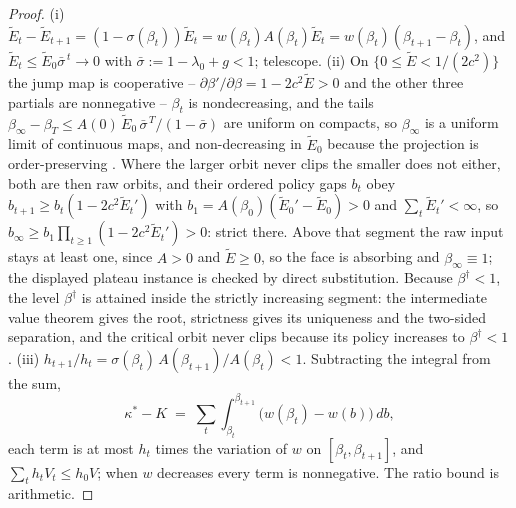 \documentclass[11pt]{article}
\theoremstyle{definition}
\theoremstyle{remark}
\numberwithin{equation}{section}
\begin{document}
\begin{proof}
(i) $\tilde E_t - \tilde E_{t+1} = (1-\sigma(\beta_t))\tilde E_t = w(\beta_t)A(\beta_t)\tilde E_t = w(\beta_t)(\beta_{t+1}-\beta_t)$, and $\tilde E_t \le \tilde E_0\bar\sigma^{\,t} \to 0$ with $\bar\sigma := 1-\lambda_0+g < 1$; telescope. (ii) On $\{0 \le \tilde E < 1/(2c^2)\}$ the jump map is cooperative -- $\partial\beta'/\partial\beta = 1-2c^2\tilde E > 0$ and the other three partials are nonnegative -- $\beta_t$ is nondecreasing, and the tails $\beta_\infty - \beta_T \le A(0)\,\tilde E_0\,\bar\sigma^{\,T}/(1-\bar\sigma)$ are uniform on compacts, so $\beta_\infty$ is a uniform limit of continuous maps, and non-decreasing in $\tilde E_0$ because the projection is order-preserving \citep{hofheinz2026drift}. Where the larger orbit never clips the smaller does not either, both are then raw orbits, and their ordered policy gaps $b_t$ obey $b_{t+1} \ge b_t(1-2c^2\tilde E_t')$ with $b_1 = A(\beta_0)(\tilde E_0' - \tilde E_0) > 0$ and $\sum_t \tilde E_t' < \infty$, so $b_\infty \ge b_1 \prod_{t\ge1}(1-2c^2\tilde E_t') > 0$: strict there. Above that segment the raw input stays at least one, since $A > 0$ and $\tilde E \ge 0$, so the face is absorbing and $\beta_\infty \equiv 1$; the displayed plateau instance is checked by direct substitution. Because $\beta^\dagger < 1$, the level $\beta^\dagger$ is attained inside the strictly increasing segment: the intermediate value theorem gives the root, strictness gives its uniqueness and the two-sided separation, and the critical orbit never clips because its policy increases to $\beta^\dagger < 1$. (iii) $h_{t+1}/h_t = \sigma(\beta_t)\,A(\beta_{t+1})/A(\beta_t) < 1$. Subtracting the integral from the sum,
\[
\kappa^\ast - K \;=\; \sum_t \int_{\beta_t}^{\beta_{t+1}} \bigl(w(\beta_t) - w(b)\bigr)\,db,
\]
each term is at most $h_t$ times the variation of $w$ on $[\beta_t,\beta_{t+1}]$, and $\sum_t h_t V_t \le h_0 V$; when $w$ decreases every term is nonnegative. The ratio bound is arithmetic.
\end{proof}
\end{document}
